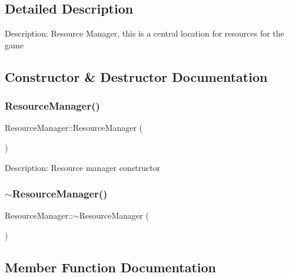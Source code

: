 \subsection{Detailed Description}
Description\+: Resource Manager, this is a central location for resources for the game 

\subsection{Constructor \& Destructor Documentation}
\mbox{\label{class_resource_manager_a3b32babd2e81909bbd90d7f2d566fadb}} 
\subsubsection{\texorpdfstring{ResourceManager()}{ResourceManager()}}
{\footnotesize\ttfamily Resource\+Manager\+::\+Resource\+Manager (\begin{DoxyParamCaption}{ }\end{DoxyParamCaption})}

Description\+: Resource manager constructor \mbox{\label{class_resource_manager_a671c186e4630599e7e36d000c53eaf80}} 
\subsubsection{\texorpdfstring{$\sim$ResourceManager()}{~ResourceManager()}}
{\footnotesize\ttfamily Resource\+Manager\+::$\sim$\+Resource\+Manager (\begin{DoxyParamCaption}{ }\end{DoxyParamCaption})\hspace{0.3cm}{\ttfamily [inline]}}



\subsection{Member Function Documentation}
\mbox{\label{class_resource_manager_a950ecbe357ba67d190c261b686fe72b2}} 
